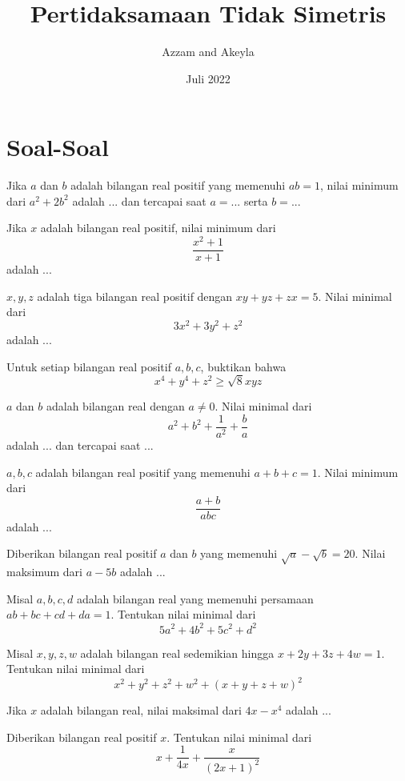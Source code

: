 \documentclass[11pt]{scrartcl}
\title{Pertidaksamaan Tidak Simetris}
\author{Azzam and Akeyla}
\date{Juli 2022}
\begin{document}
\maketitle

\renewcommand*\contentsname{Daftar Isi}
\tableofcontents

\newpage

\section{Soal-Soal}
\begin{problem}
Jika $a$ dan $b$ adalah bilangan real positif yang memenuhi $ab = 1$, nilai minimum dari $a^2 + 2b^2$ adalah ... dan tercapai saat $a = ...$ serta $b = ...$
\end{problem}
\begin{problem}
Jika $x$ adalah bilangan real positif, nilai minimum dari \[\frac{x^2 + 1}{x + 1}\] adalah ...
\end{problem}
\begin{problem}
$x, y, z$ adalah tiga bilangan real positif dengan $xy + yz + zx = 5$. Nilai minimal dari $$3x^2 + 3y^2  + z^2$$ adalah ...
\end{problem}
\begin{problem}
Untuk setiap bilangan real positif $a,b,c$, buktikan bahwa \[x^4 + y^4 + z^2 \geq \sqrt{8}xyz\]
\end{problem}
\begin{problem}
$a$ dan $b$ adalah bilangan real dengan $a\neq 0$. Nilai minimal dari $$a^2 + b^2 + \frac{1}{a^2} + \frac{b}{a}$$ adalah ... dan tercapai saat ...
\end{problem}
\begin{problem}
$a, b, c$ adalah bilangan real positif yang memenuhi $a + b + c  = 1$. Nilai minimum dari $$\frac{a + b}{abc}$$ adalah ...
\end{problem}
\begin{problem}
Diberikan bilangan real positif $a$ dan $b$ yang memenuhi $\sqrt{a} - \sqrt{b} = 20$. Nilai maksimum dari $a - 5b$ adalah ...
\end{problem}
\begin{problem}
Misal $a, b, c, d$ adalah bilangan real yang memenuhi persamaan $ab + bc + cd + da = 1$. Tentukan nilai minimal dari \[5a^2 + 4b^2 + 5c^2 + d^2\]
\end{problem}
\begin{problem}
Misal $x, y, z, w$ adalah bilangan real sedemikian hingga $x + 2y + 3z + 4w = 1$. Tentukan nilai minimal dari \[x^2 + y^2 + z^2 + w^2 + (x + y + z + w)^2\]
\end{problem}
\begin{problem}
Jika $x$ adalah bilangan real, nilai maksimal dari $4x - x^4$ adalah ...
\end{problem}
\begin{problem}
Diberikan bilangan real positif $x$. Tentukan nilai minimal dari \[x + \dfrac{1}{4x} + \dfrac{x}{(2x + 1)^2}\]
\end{problem}
\end{document}

